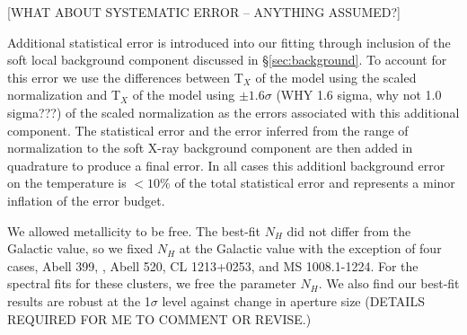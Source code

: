 \documentclass{emulateapj}
\begin{document}
{[WHAT ABOUT SYSTEMATIC ERROR -- ANYTHING ASSUMED?]

Additional statistical error is introduced into our fitting through inclusion of
the soft local background component discussed in
\S\ref{sec:background}. To account for this error we use the
differences between T$_{X}$ of the model using the scaled 
normalization and T$_{X}$ of the model using $\pm1.6\sigma$ 
(WHY 1.6 sigma, why not 1.0 sigma???) of the
scaled normalization as the errors associated with this additional
component. The statistical error and the error inferred from the
range of normalization to the soft X-ray background component 
are then added in quadrature to produce a final
error. In all cases this additionl background error on the temperature is  $< 10\%$ of the total
statistical error and represents a minor inflation of the error budget.



We allowed metallicity
to be free. The best-fit  $N_H$ did not differ from the Galactic value, so we
fixed $N_H$ at the Galactic value with
the exception of four cases, Abell 399,
\citep{2004MNRAS.351.1439S}, Abell 520, CL 1213+0253, and MS
1008.1-1224.  For the spectral fits for these clusters, we free the parameter  $N_H$.
We also find our best-fit results are robust at the 1$\sigma$ level
against change in aperture size (DETAILS REQUIRED FOR ME TO COMMENT 
OR REVISE.)


}
\end{document}
